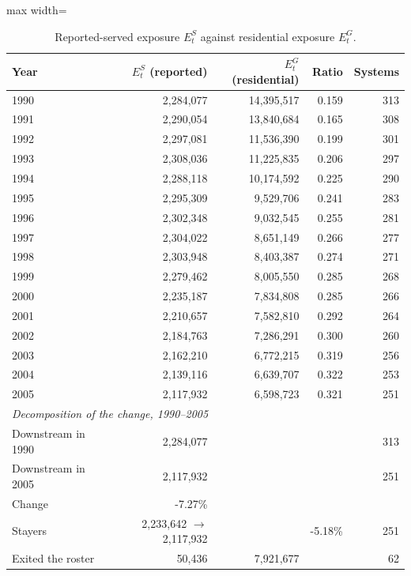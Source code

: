 \begin{table}[ht]
\centering
\caption{Reported-served exposure $E^{S}_t$ against residential exposure $E^{G}_t$.}
\label{tab:backcast_reported_exposure}
\begin{adjustbox}{max width=\textwidth}
\begin{tabular}{lrrrr}
\toprule
Year & $E^{S}_t$ (reported) & $E^{G}_t$ (residential) & Ratio & Systems \\
\midrule
1990 & 2,284,077 & 14,395,517 & 0.159 & 313 \\
1991 & 2,290,054 & 13,840,684 & 0.165 & 308 \\
1992 & 2,297,081 & 11,536,390 & 0.199 & 301 \\
1993 & 2,308,036 & 11,225,835 & 0.206 & 297 \\
1994 & 2,288,118 & 10,174,592 & 0.225 & 290 \\
1995 & 2,295,309 & 9,529,706 & 0.241 & 283 \\
1996 & 2,302,348 & 9,032,545 & 0.255 & 281 \\
1997 & 2,304,022 & 8,651,149 & 0.266 & 277 \\
1998 & 2,303,948 & 8,403,387 & 0.274 & 271 \\
1999 & 2,279,462 & 8,005,550 & 0.285 & 268 \\
2000 & 2,235,187 & 7,834,808 & 0.285 & 266 \\
2001 & 2,210,657 & 7,582,810 & 0.292 & 264 \\
2002 & 2,184,763 & 7,286,291 & 0.300 & 260 \\
2003 & 2,162,210 & 6,772,215 & 0.319 & 256 \\
2004 & 2,139,116 & 6,639,707 & 0.322 & 253 \\
2005 & 2,117,932 & 6,598,723 & 0.321 & 251 \\
\midrule
\multicolumn{5}{l}{\textit{Decomposition of the change, 1990--2005}} \\
Downstream in 1990 & 2,284,077 & & & 313 \\
Downstream in 2005 & 2,117,932 & & & 251 \\
\quad Change & -7.27\% & & & \\
\quad Stayers & 2,233,642 $\rightarrow$ 2,117,932 & & -5.18\% & 251 \\
\quad Exited the roster & 50,436 & 7,921,677 & & 62 \\
\bottomrule
\end{tabular}
\end{adjustbox}
\begin{minipage}{\textwidth}\footnotesize

\end{minipage}
\end{table}
